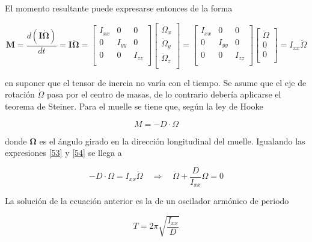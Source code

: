 \documentclass[twoside,11pt]{book}
\begin{document}
El momento resultante puede expresarse entonces de la forma 

\begin{equation}
\mathbf{M}=\frac{d(\mathbf{I}\dot{\mathbf{\Omega}})}{dt}=\mathbf{I}\ddot{\mathbf{\Omega}}=\left[ \begin{array}{ccc}
I_{xx} & 0 & 0 \\
0 & I_{yy} & 0 \\
0 & 0 & I_{zz} \\
\end{array} \right]\left[ \begin{array}{c}
\ddot{\Omega}_{x} \\
\ddot{\Omega}_{y} \\
\ddot{\Omega}_{z} \\
\end{array} \right]=\left[ \begin{array}{ccc}
I_{xx} & 0 & 0 \\
0 & I_{yy} & 0 \\
0 & 0 & I_{zz} \\
\end{array} \right]\left[ \begin{array}{c}
\ddot{\Omega} \\
0 \\
0 \\
\end{array} \right] = I_{xx} \ddot{\Omega}
\label{53}
\end{equation}

en suponer que el tensor de inercia no varía con el tiempo. Se asume 
que el eje de rotación $\dot{\Omega}$ pasa por el centro de masas, de lo contrario debería aplicarse el teorema de Steiner. Para el muelle se tiene que, según la ley de Hooke

\begin{equation}
M=-D \cdot \Omega
\label{54}
\end{equation}

donde $\mathbf{\Omega}$ es el ángulo girado en la dirección longitudinal del muelle. Igualando las expresiones \ref{53} y \ref{54} se llega a 

\begin{equation}
-D \cdot \Omega = I_{xx}\ddot{\Omega}\quad \Longrightarrow \quad \ddot{\Omega}+\frac{D}{I_{xx}}\Omega =0 
\end{equation}

La solución de la ecuación anterior es la de un oscilador armónico de periodo 

\begin{equation}
T=2\pi \sqrt{\frac{I_{xx}}{D}}
\end{equation}
\end{document}
